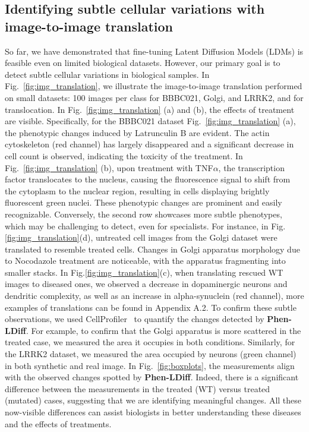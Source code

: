 \subsection{Identifying subtle cellular variations with image-to-image translation}

So far, we have demonstrated that fine-tuning Latent Diffusion Models (LDMs) is feasible even on limited biological datasets. However, our primary goal is to detect subtle cellular variations in biological samples. In Fig.~\ref{fig:img_translation}, we illustrate the image-to-image translation performed on small datasets: 100 images per class for BBBC021, Golgi, and LRRK2, and  for translocation. In Fig.~\ref{fig:img_translation} (a) and (b), the effects of treatment are visible. Specifically, for the BBBC021 dataset Fig.~\ref{fig:img_translation} (a), the phenotypic changes induced by Latrunculin B are evident. The actin cytoskeleton (red channel) has largely disappeared and a significant decrease in cell count is observed, indicating the toxicity of the treatment. In Fig.~\ref{fig:img_translation} (b), upon treatment with TNF$\alpha$, the transcription factor translocates to the nucleus, causing the fluorescence signal to shift from the cytoplasm to the nuclear region, resulting in cells displaying brightly fluorescent green nuclei. These phenotypic changes are prominent and easily recognizable. Conversely, the second row showcases more subtle phenotypes, which may be challenging to detect, even for specialists. For instance, in Fig.\ref{fig:img_translation}(d), untreated cell images from the Golgi dataset were translated to resemble treated cells. Changes in Golgi apparatus morphology due to Nocodazole treatment are noticeable, with the apparatus fragmenting into smaller stacks. In Fig.\ref{fig:img_translation}(c), when translating rescued WT images to diseased ones, we observed a decrease in dopaminergic neurons and dendritic complexity, as well as an increase in alpha-synuclein (red channel), more examples of translations can be found in Appendix A.2. To confirm these subtle observations, we used CellProfiler~\cite{cellprofiler} to quantify the changes detected by \textbf{Phen-LDiff}. For example, to confirm that the Golgi apparatus is more scattered in the treated case, we measured the area it occupies in both conditions. Similarly, for the LRRK2 dataset, we measured the area occupied by neurons (green channel) in both synthetic and real image. In Fig.~\ref{fig:boxplots}, the measurements align with the observed changes spotted by \textbf{Phen-LDiff}. Indeed, there is a significant difference between the measurements in the treated (WT) versus treated (mutated) cases, suggesting that we are identifying meaningful changes. All these now-visible differences can assist biologists in better understanding these diseases and the effects of treatments.

